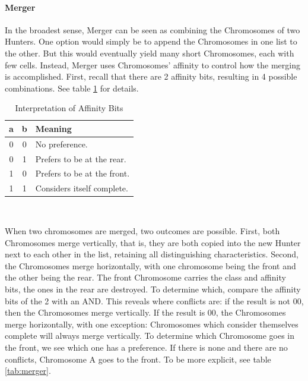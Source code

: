 \paragraph{Merger}
In the broadest sense, Merger can be seen as combining the Chromosomes of two Hunters.  One option would simply be to append the Chromosomes in one list to the other.  But this would eventually yield many short Chromosomes, each with few cells.  Instead, Merger uses Chromosomes' affinity to control how the merging is accomplished.  First, recall that there are 2 affinity bits, resulting in 4 possible combinations. See table \ref{tab:affinity} for details.\\
\begin{table}
\centering

\begin{tabular}{|c c | l|}
	\hline
	a & b & Meaning \\
	\hline
	0 & 0 & No preference.\\
	0 & 1 & Prefers to be at the rear.\\
	1 & 0 & Prefers to be at the front.\\
	1 & 1 & Considers itself complete.\\
	\hline
\end{tabular}\\
\caption{Interpretation of Affinity Bits}
\label{tab:affinity}
\end{table}
When two chromosomes are merged, two outcomes are possible.  First, both Chromosomes merge vertically, that is, they are both copied into the new Hunter next to each other in the list, retaining all distinguishing characteristics.  Second, the Chromosomes merge horizontally, with one chromosome being the front and the other being the rear.  The front Chromosome carries the class and affinity bits, the ones in the rear are destroyed.  To determine which, compare the affinity bits of the 2 with an AND.  This reveals where conflicts are: if the result is not 00, then the Chromosomes merge vertically.  If the result is 00, the Chromosomes merge horizontally, with one exception: Chromosomes which consider themselves complete will always merge vertically.
To determine which Chromosome goes in the front, we see which one has a preference. If there is none and there are no conflicts, Chromosome A goes to the front.  To be more explicit, see table \ref{tab:merger}.\\
